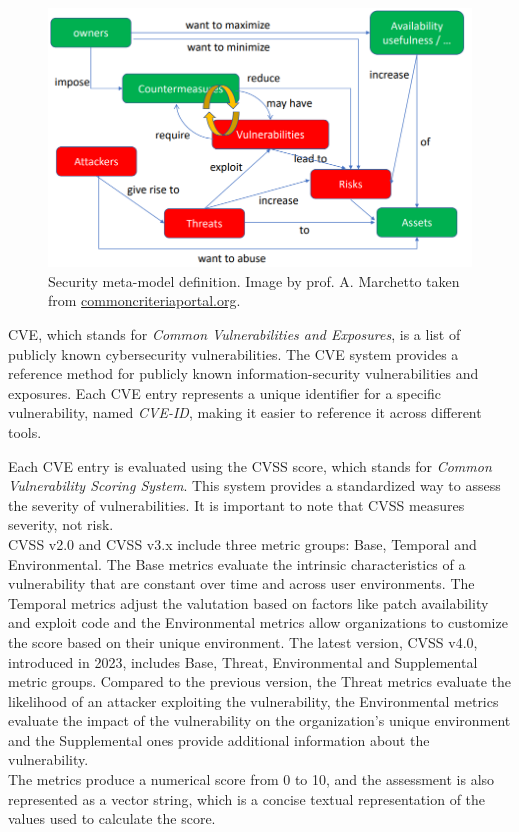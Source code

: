 \begin{figure}[h]
  \centering
  \includegraphics[scale=0.6]{chapters/02/assets/security-meta-model-def}
  \caption[Security meta-model definition. Image by prof. A. Marchetto taken from commoncriteriaportal.org.]{Security meta-model definition. Image by prof. A. Marchetto taken from \url{commoncriteriaportal.org}.}
  \label{fig:security-meta-model-def}
\end{figure}

CVE, which stands for \textit{Common Vulnerabilities and Exposures}, is a list of publicly known cybersecurity vulnerabilities. The CVE system provides a reference method for publicly known information-security vulnerabilities and exposures. Each CVE entry represents a unique identifier for a specific vulnerability, named \textit{CVE-ID}, making it easier to reference it across different tools.

Each CVE entry is evaluated using the CVSS score, which stands for \textit{Common Vulnerability Scoring System}. This system provides a standardized way to assess the severity of vulnerabilities. It is important to note that CVSS measures severity, not risk. \\
CVSS v2.0 and CVSS v3.x include three metric groups: Base, Temporal and Environmental. The Base metrics evaluate the intrinsic characteristics of a vulnerability that are constant over time and across user environments. The Temporal metrics adjust the valutation based on factors like patch availability and exploit code and the Environmental metrics allow organizations to customize the score based on their unique environment. The latest version, CVSS v4.0, introduced in 2023, includes Base, Threat, Environmental and Supplemental metric groups. Compared to the previous version, the Threat metrics evaluate the likelihood of an attacker exploiting the vulnerability, the Environmental metrics evaluate the impact of the vulnerability on the organization's unique environment and the Supplemental ones provide additional information about the vulnerability.~\cite{cvss-4-spec}\\
The metrics produce a numerical score from 0 to 10, and the assessment is also represented as a vector string, which is a concise textual representation of the values used to calculate the score.~\cite{cvss-metrics}

